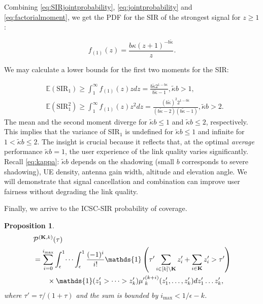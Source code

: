 \documentclass[conference]{IEEEtran}
\theoremstyle{definition}
\theoremstyle{plain}
\newtheorem{prop}[thm4]{Proposition}
\begin{document}
          Combining \eqref{eq:SIRjointprobability}, \eqref{eq:jointprobability} and \eqref{eq:factorialmoment}, we get the PDF for the SIR of the strongest signal for $z\geq 1$:
          
          \begin{equation}
            f_{(1)}(z) = \frac {b\kappa\left({z + 1} \right)^{-b\tilde{\kappa}}} {z}.
          \end{equation}


          We may calculate a lower bounds for the first two moments for the SIR:



          \begin{align}
            &\mathbb{E}(\text{SIR}_1)  \geq\int_{1}^{\infty}f_{(1)}(z)zdz=\frac{b \tilde{\kappa}  2^{1-b \kappa }}{b \tilde{\kappa} -1}, \tilde{\kappa}b >1, \\
            &\mathbb{E}(\text{SIR}^2_1) \geq \int_{1}^{\infty}f_{(1)}(z)z^2dz = \frac{(b \tilde{\kappa}) ^2 2^{1-b \tilde{\kappa} }}{(b\tilde{\kappa} - 2)  (b\tilde{\kappa} - 1)},\tilde{\kappa}b >2.
          \end{align}
          The mean and the second moment diverge for $\tilde{\kappa}b\leq 1$ and $\tilde{\kappa}b\leq 2$, respectively. This implies that the variance of SIR$_1$ is undefined for $\tilde{\kappa}b \leq 1$ and infinite for $1 <\tilde{\kappa}b \leq 2$. The insight is crucial because it reflects that, at the optimal \textit{average} performance $\tilde{\kappa}b = 1$, the user experience of the link quality varies significantly. Recall \eqref{eq:kappa}: $\tilde{\kappa}b$ depends on the shadowing (small $b$ corresponds to severe shadowing), UE density, antenna gain width, altitude and elevation angle. We will demonstrate that signal cancellation and combination can improve user fairness without degrading the link quality.



          
          Finally, we arrive to the ICSC-SIR probability of coverage.
          \begin{prop}
            \begin{align}
              &\mathcal{P}^{(\mathbf{K},k)}(\tau) \nonumber\\
              &= \sum^{i_{\text{max}}}_{i=0} \int_{\epsilon}^1 \dots \int_{\epsilon}^1\frac{(-1)^i}{i!}\mathds{1}\left(\tau' \sum_{i \in [k] \setminus  \mathbf{K}}z'_i+ \sum_{i\in \mathbf{K}} z'_i>\tau' \right) \nonumber \\
              &\hspace{0.7cm}\times \mathds{1}(z'_1>\dots>z'_k){\mu'}_k^{(k+i)}(z'_1,\dots,z'_k) d z'_1 \dots z'_k,
            \end{align}
            where $\tau' = \tau/(1+\tau)$ and the sum is bounded by $i_{\text{max}}< 1/\epsilon-k$. 
          \end{prop}
\end{document}
